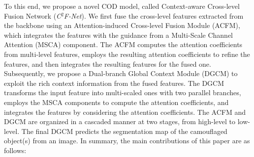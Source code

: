 \documentclass{article}
\def\OurModel{\textit{C$^2$F-Net}} %
\begin{document}
To this end, we propose a novel COD model, called Context-aware Cross-level Fusion Network (\OurModel).
We first fuse the cross-level features extracted from the backbone using an Attention-induced Cross-level Fusion Module (ACFM), which integrates the features with the guidance from a Multi-Scale Channel Attention (MSCA) component.
The ACFM computes the attention coefficients from multi-level features, employs the resulting attention coefficients to refine the features, and then integrates the resulting features for the fused one.
Subsequently, we propose a Dual-branch Global Context Module (DGCM) to exploit the rich context information from the fused features.
The DGCM transforms the input feature into multi-scaled ones with two parallel branches, employs the MSCA components to compute the attention coefficients, and integrates the features by considering the attention coefficients.
The ACFM and DGCM are organized in a cascaded manner at two stages, from high-level to low-level.
The final DGCM predicts the segmentation map of the camouflaged object(s) from an image.
In summary, the main contributions of this paper are as follows:
\end{document}
